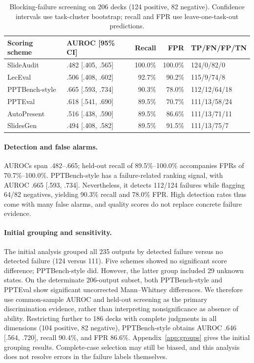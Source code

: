\begin{table}[t]
\caption{Blocking-failure screening on 206 decks (124 positive, 82 negative). Confidence intervals use task-cluster bootstrap; recall and FPR use leave-one-task-out predictions.}
\label{tab:screening}\centering\small
\setlength{\tabcolsep}{4pt}
\begin{tabular}{@{}l l r r l@{}}
\toprule Scoring scheme & AUROC [95\% CI] & Recall & FPR & TP/FN/FP/TN\\\midrule
SlideAudit & .482 [.405, .565] & 100.0\% & 100.0\% & 124/0/82/0\\
LecEval & .506 [.408, .602] & 92.7\% & 90.2\% & 115/9/74/8\\
PPTBench-style & .665 [.593, .734] & 90.3\% & 78.0\% & 112/12/64/18\\
PPTEval & .618 [.541, .690] & 89.5\% & 70.7\% & 111/13/58/24\\
AutoPresent & .516 [.438, .590] & 89.5\% & 86.6\% & 111/13/71/11\\
SlidesGen & .494 [.408, .582] & 89.5\% & 91.5\% & 111/13/75/7\\\bottomrule
\end{tabular}
\end{table}

\paragraph{Detection and false alarms.}
AUROCs span .482--.665; held-out recall of 89.5\%--100.0\% accompanies FPRs of 70.7\%--100.0\%. PPTBench-style has a failure-related ranking signal, with AUROC .665 [.593, .734]. Nevertheless, it detects 112/124 failures while flagging 64/82 negatives, yielding 90.3\% recall and 78.0\% FPR. High detection rates thus come with many false alarms, and quality scores do not replace concrete failure evidence.

\paragraph{Initial grouping and sensitivity.}
The initial analysis grouped all 235 outputs by detected failure versus no detected failure (124 versus 111). Five schemes showed no significant score difference; PPTBench-style did. However, the latter group included 29 unknown states. On the determinate 206-output subset, both PPTBench-style and PPTEval show significant uncorrected Mann--Whitney differences. We therefore use common-sample AUROC and held-out screening as the primary discrimination evidence, rather than interpreting nonsignificance as absence of ability. Restricting further to 186 decks with complete judgments in all dimensions (104 positive, 82 negative), PPTBench-style obtains AUROC .646 [.564, .720], recall 90.4\%, and FPR 86.6\%. Appendix~\ref{app:groups} gives the initial grouping results. Complete-case selection may still be biased, and this analysis does not resolve errors in the failure labels themselves.

